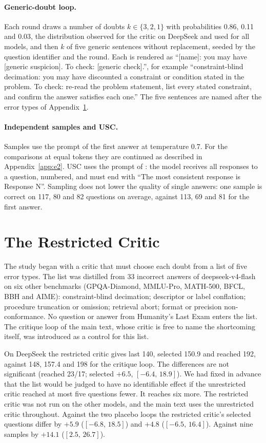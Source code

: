 \documentclass[11pt]{article}
\newcommand{\ds}{DeepSeek}
\newcommand{\ci}[2]{$[#1,\,#2]$}
\begin{document}
\paragraph{Generic-doubt loop.}
Each round draws a number of doubts $k\in\{3,2,1\}$ with probabilities 0.86, 0.11 and 0.03, the distribution observed for the critic on \ds{} and used for all models, and then $k$ of five generic sentences without replacement, seeded by the question identifier and the round.
Each is rendered as ``[name]: you may have [generic suspicion]. To check: [generic check].'', for example ``constraint-blind decimation: you may have discounted a constraint or condition stated in the problem. To check: re-read the problem statement, list every stated constraint, and confirm the answer satisfies each one.''
The five sentences are named after the error types of Appendix~\ref{app:bank}.

\paragraph{Independent samples and USC.}
Samples use the prompt of the first answer at temperature 0.7. For the comparisons at equal tokens they are continued as described in Appendix~\ref{app:e2}. USC uses the prompt of \citet{chen2023usc}: the model receives all responses to a question, numbered, and must end with ``The most consistent response is Response N''.
Sampling does not lower the quality of single answers: one sample is correct on 117, 80 and 82 questions on average, against 113, 69 and 81 for the first answer.

\section{The Restricted Critic}
\label{app:bank}

The study began with a critic that must choose each doubt from a list of five error types.
The list was distilled from 33 incorrect answers of deepseek-v4-flash on six other benchmarks (GPQA-Diamond, MMLU-Pro, MATH-500, BFCL, BBH and AIME): constraint-blind decimation; descriptor or label conflation; procedure truncation or omission; retrieval abort; format or precision non-conformance.
No question or answer from Humanity's Last Exam enters the list.
The critique loop of the main text, whose critic is free to name the shortcoming itself, was introduced as a control for this list.

On \ds{} the restricted critic gives last 140, selected 150.9 and reached 192, against 148, 157.4 and 198 for the critique loop. The differences are not significant (reached 23/17; selected $+6.5$, \ci{-6.4}{18.9}).
We had fixed in advance that the list would be judged to have no identifiable effect if the unrestricted critic reached at most five questions fewer. It reaches six more.
The restricted critic was not run on the other models, and the main text uses the unrestricted critic throughout.
Against the two placebo loops the restricted critic's selected questions differ by $+5.9$ (\ci{-6.8}{18.5}) and $+4.8$ (\ci{-6.5}{16.4}). Against nine samples by $+14.1$ (\ci{2.5}{26.7}).
\end{document}
